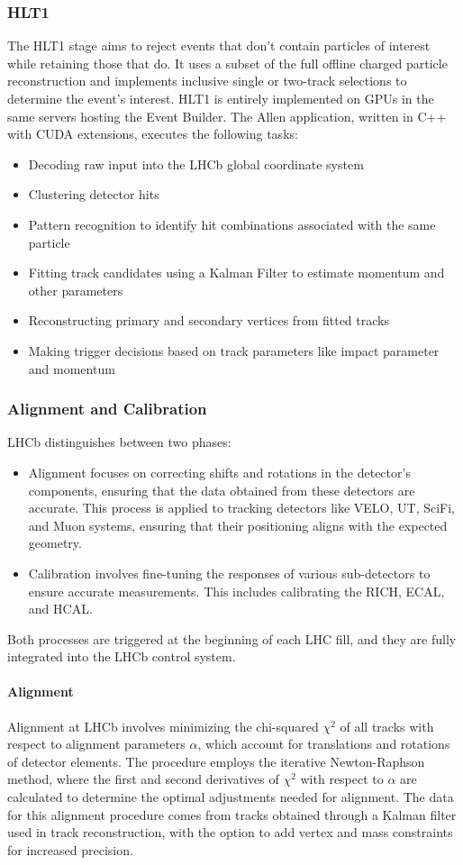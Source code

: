 \subsubsection{HLT1}
The HLT1 stage aims to reject events that don't contain particles of interest while retaining those that do. It uses a subset of the full offline charged particle reconstruction and implements inclusive single or two-track selections to determine the event's interest. HLT1 is entirely implemented on GPUs in the same servers hosting the Event Builder. The Allen application, written in C++ with CUDA extensions, executes the following tasks:
\begin{itemize}
\item Decoding raw input into the LHCb global coordinate system
\item Clustering detector hits
\item Pattern recognition to identify hit combinations associated with the same particle
\item Fitting track candidates using a Kalman Filter to estimate momentum and other parameters
\item Reconstructing primary and secondary vertices from fitted tracks
\item Making trigger decisions based on track parameters like impact parameter and momentum
\end{itemize}
\subsubsection{Alignment and Calibration}
LHCb distinguishes between two phases:
\begin{itemize}
\item Alignment focuses on correcting shifts and rotations in the detector's components, ensuring that the data obtained from these detectors are accurate. This process is applied to tracking detectors like VELO, UT, SciFi, and Muon systems, ensuring that their positioning aligns with the expected geometry.
\item Calibration involves fine-tuning the responses of various sub-detectors to ensure accurate measurements. This includes calibrating the RICH, ECAL, and HCAL.
\end{itemize}
Both processes are triggered at the beginning of each LHC fill, and they are fully integrated into the LHCb control system. 
\paragraph{Alignment}
Alignment at LHCb involves minimizing the chi-squared $\chi^2$ of all tracks with respect to alignment parameters $\alpha$, which account for translations and rotations of detector elements. The procedure employs the iterative Newton-Raphson method, where the first and second derivatives of $\chi^2$ with respect to 
 $\alpha$ are calculated to determine the optimal adjustments needed for alignment. The data for this alignment procedure comes from tracks obtained through a Kalman filter used in track reconstruction, with the option to add vertex and mass constraints for increased precision.

